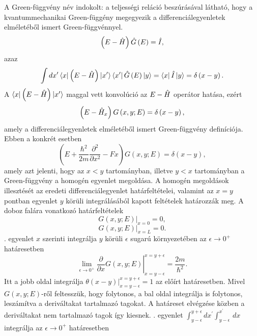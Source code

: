 A Green-függvény név indokolt: a teljességi reláció beszúrásával látható, hogy a kvantummechanikai Green-függény megegyezik a differenciálegyenletek elméletéből ismert Green-függvénnyel.
\begin{equation}
    \left(E-\hat{H}\right)\hat{G}\left( E \right) = \hat{I},
\end{equation}
azaz
\begin{equation}
    \int dx^\prime \Bra{x}\left(E-\hat{H}\right) \Ket{x^\prime}\Bra{x^\prime} \hat{G}\left( E \right)\Ket{y} = \Bra{x}\hat{I}\Ket{y} = \delta \left(x - y\right).
\end{equation} 
A $\Bra{x}\left(E-\hat{H}\right) \Ket{x^\prime}$ maggal vett konvolúció az $E-\hat{H}$ operátor hatása, ezért
\begin{equation}
    \left(E-\hat{H}_x\right) G\left(x, y; E\right) = \delta\left(x - y\right),
\end{equation}
amely a differenciálegyenletek elméletéből ismert Green-függvény definíciója. Ebben a konkrét esetben
\begin{equation}
    \left(E +\frac{\hbar^2}{2m}\frac{\partial^2}{\partial x^2} - Fx \right) G\left(x, y; E\right) = \delta\left(x - y\right),
	\label{green:deltaeq}
\end{equation}
amely azt jelenti, hogy az $x < y$ tartományban, illetve $y < x$ tartományban a Green-függvény a homogén egyenlet megoldása. A homogén megoldások illesztését az eredeti differenciálegyenlet határfeltételei, valamint az $x = y$ pontban  egyenlet $y$ körüli integrálásából kapott feltételek határozzák meg. A doboz falára vonatkozó határfeltételek
\begin{equation}
	\left. G\left(x,y;E\right)\right\rvert_{x = 0} = 0,
	\label{green:01}
\end{equation}
\begin{equation}
	\left. G\left(x,y;E\right)\right\rvert_{x = L} = 0.
	\label{green:02}
\end{equation}
. egyenlet $x$ szerinti integrálja $y$ körüli $\epsilon$ sugarú környezetében az $\epsilon \to 0^+$ határesetben
\begin{equation}
	\lim_{\epsilon \to 0^+}\left.\frac{\partial}{\partial x}G\left(x,y;E \right)\right\rvert_{x = y - \epsilon}^{x = y + \epsilon} = \frac{2m}{\hbar^2}.
	\label{egzakt:jump}
\end{equation}
Itt a jobb oldal integrálja $\left. \theta\left(x - y\right) \right\rvert_{x = y - \epsilon}^{x = y + \epsilon} = 1$ az előírt határesetben. Mivel $G(x,y;E)$-ről feltesszük, hogy folytonos, a bal oldal integrálja is folytonos, leszámítva a deriváltakat tartalmazó tagokat. A határeset elvégzése közben a deriváltakat nem tartalmazó tagok így kiesnek. . egyenlet $\int_{y-\epsilon}^{y+\epsilon}dx^\prime \int_{y-\epsilon}^{x^\prime} \,dx$ integrálja az $\epsilon \to 0^+$ határesetben
